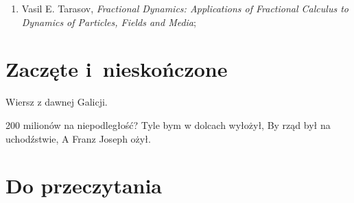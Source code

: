\documentclass[a4paper,11pt]{article}
\begin{document}
\begin{enumerate}
\item Vasil E. Tarasov, \emph{Fractional Dynamics: Applications of Fractional Calculus to Dynamics of Particles, Fields and Media};

























































\end{enumerate}










\newpage
\section{Zaczęte i~nieskończone}

\vspace{\spaceTwo}



Wiersz z dawnej Galicji.

200 milionów na niepodległość? Tyle bym w dolcach wyłożył, By rząd był
na uchodźstwie, A Franz Joseph ożył.










\newpage
\section{Do przeczytania}
\end{document}
